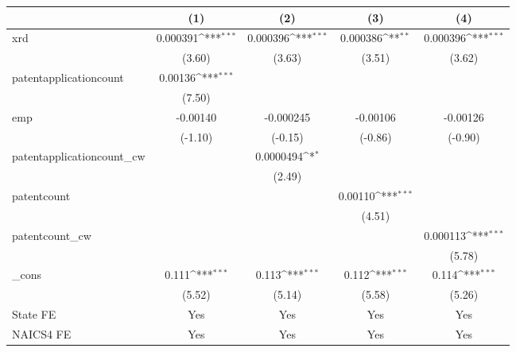 {
\def\sym#1{\ifmmode^{#1}\else\(^{#1}\)\fi}
\begin{tabular}{l*{4}{c}}
\hline\hline
            &\multicolumn{1}{c}{(1)}         &\multicolumn{1}{c}{(2)}         &\multicolumn{1}{c}{(3)}         &\multicolumn{1}{c}{(4)}         \\
\hline
xrd         &    0.000391\sym{***}&    0.000396\sym{***}&    0.000386\sym{**} &    0.000396\sym{***}\\
            &      (3.60)         &      (3.63)         &      (3.51)         &      (3.62)         \\
[1em]
patentapplicationcount&     0.00136\sym{***}&                     &                     &                     \\
            &      (7.50)         &                     &                     &                     \\
[1em]
emp         &    -0.00140         &   -0.000245         &    -0.00106         &    -0.00126         \\
            &     (-1.10)         &     (-0.15)         &     (-0.86)         &     (-0.90)         \\
[1em]
patentapplicationcount\_cw&                     &   0.0000494\sym{*}  &                     &                     \\
            &                     &      (2.49)         &                     &                     \\
[1em]
patentcount &                     &                     &     0.00110\sym{***}&                     \\
            &                     &                     &      (4.51)         &                     \\
[1em]
patentcount\_cw&                     &                     &                     &    0.000113\sym{***}\\
            &                     &                     &                     &      (5.78)         \\
[1em]
\_cons      &       0.111\sym{***}&       0.113\sym{***}&       0.112\sym{***}&       0.114\sym{***}\\
            &      (5.52)         &      (5.14)         &      (5.58)         &      (5.26)         \\
[1em]
State FE    &         Yes         &         Yes         &         Yes         &         Yes         \\
[1em]
NAICS4 FE   &         Yes         &         Yes         &         Yes         &         Yes         \\

\end{tabular}}
